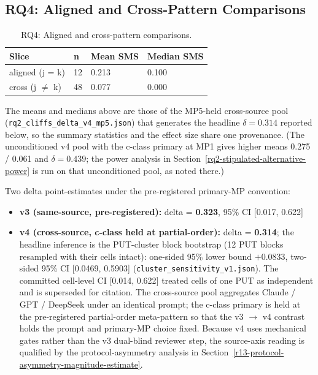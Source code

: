 \documentclass[manuscript,screen,review]{acmart}
\begin{document}
\subsection{RQ4: Aligned and Cross-Pattern Comparisons}\label{rq2-aligned-vs-cross-cliffs-delta}

{%
\begin{longtable}[]{@{}llll@{}}
\caption{RQ4: Aligned and cross-pattern comparisons.}\label{tab:p2-09}\\
\toprule\noalign{}
Slice & n & Mean SMS & Median SMS \\
\midrule\noalign{}
\endhead
\bottomrule\noalign{}
\endlastfoot
aligned (j = k) & 12 & 0.213 & 0.100 \\
cross (j $\neq$ k) & 48 & 0.077 & 0.000 \\
\end{longtable}
}

The means and medians above are those of the MP5-held cross-source pool
(\texttt{rq2\_cliffs\_delta\_v4\_mp5.json}) that generates the headline
$\delta = 0.314$ reported below, so the summary statistics and the effect
size share one provenance. (The unconditioned v4 pool with the c-class
primary at MP1 gives higher means 0.275 / 0.061 and $\delta = 0.439$; the
power analysis in Section~\ref{rq2-stipulated-alternative-power} is run on
that unconditioned pool, as noted there.)

Two delta point-estimates under the pre-registered primary-MP
convention:

\begin{itemize}

\item
  \textbf{v3 (same-source, pre-registered):} delta = \textbf{0.323},
  95\% CI {[}0.017, 0.622{]}
\item
  \textbf{v4 (cross-source, c-class held at partial-order):} delta =
  \textbf{0.314}; the headline inference is the PUT-cluster block bootstrap
  (12 PUT blocks resampled with their cells intact): one-sided 95\% lower
  bound $+0.0833$, two-sided 95\% CI {[}0.0469, 0.5903{]}
  (\texttt{cluster\_sensitivity\_v1.json}). The committed cell-level CI
  {[}0.014, 0.622{]} treated cells of one PUT as independent and is
  superseded for citation. The cross-source pool
  aggregates Claude / GPT / DeepSeek under an identical prompt; the
  c-class primary is held at the pre-registered partial-order
  meta-pattern so that the v3 $\to$ v4
  contrast holds the prompt and primary-MP choice fixed. Because v4 uses
  mechanical gates rather than the v3 dual-blind reviewer step, the
  source-axis reading is qualified by the protocol-asymmetry analysis in
  Section~\ref{r13-protocol-asymmetry-magnitude-estimate}.
\end{itemize}
\end{document}
